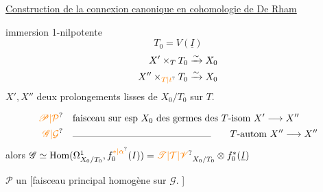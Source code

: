 \uline{Construction de la connexion canonique en cohomologie de De Rham}

immersion 1-nilpotente
\[
 T_0=V(\underline I)
\]
\[
 \begin{aligned}
 X'\times_T T_0&\xrightarrow{\sim}X_0\\
 X''\times_{\unsure{T|t}} T_0&\xrightarrow{\sim}X_0
 \end{aligned}
\]
$X',X''$ deux prolongements lisses de $X_0/T_0$ sur $T$.

\[
 \begin{aligned}
 \unsure{\mathscr P|\mathcal P}&\quad\text{faisceau sur esp }X_0\text{ des germes des }T\text{-isom }X'\longrightarrow X''\\
 \unsure{\mathscr G|\mathcal G}&\quad\rule{.42\linewidth}{.3pt}\qquad T\text{-autom }X''\longrightarrow X''
 \end{aligned}
\]
alors $\mathscr G\simeq\mathrm{Hom}(\Omega^1_{X_0/T_0},f_0^{\unsure{*|\alpha}}(I))=\unsure{\mathscr T|\mathcal T|\mathscr V}_{X_0/T_0}\otimes f_0^*(\underline I)$

$\mathscr P$ un  [faisceau principal homogène  sur $\mathscr G$. ]

